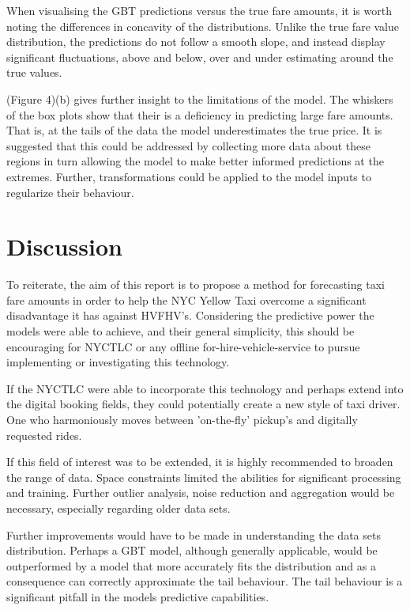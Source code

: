\documentclass[11pt]{article}
\begin{document}
When visualising the GBT predictions versus the true fare amounts, it is worth noting the differences in concavity of the distributions. Unlike the true fare value distribution, the predictions do not follow a smooth slope, and instead display significant fluctuations, above and below, over and under estimating around the true values.

(Figure 4)(b) gives further insight to the limitations of the model. The whiskers of the box plots show that their is a deficiency in predicting large fare amounts. That is, at the tails of the data the model underestimates the true price. It is suggested that this could be addressed by collecting more data about these regions in turn allowing the model to make better informed predictions at the extremes. Further, transformations could be applied to the model inputs to regularize their behaviour.

\section{Discussion}

To reiterate, the aim of this report is to propose a method for forecasting taxi fare amounts in order to help the NYC Yellow Taxi overcome a significant disadvantage it has against HVFHV's. Considering the predictive power the models were able to achieve, and their general simplicity, this should be encouraging for NYCTLC or any offline for-hire-vehicle-service to pursue implementing or investigating this technology.

If the NYCTLC were able to incorporate this technology and perhaps extend into the digital booking fields, they could potentially create a new style of taxi driver. One who harmoniously moves between 'on-the-fly' pickup's and digitally requested rides. 

If this field of interest was to be extended, it is highly recommended to broaden the range of data. Space constraints limited the abilities for significant processing and training. Further outlier analysis, noise reduction and aggregation would be necessary, especially regarding older data sets.

Further improvements would have to be made in understanding the data sets distribution. Perhaps a GBT model, although generally applicable, would be outperformed by a model that more accurately fits the distribution and as a consequence can correctly approximate the tail behaviour. The tail behaviour is a significant pitfall in the models predictive capabilities.
\end{document}
